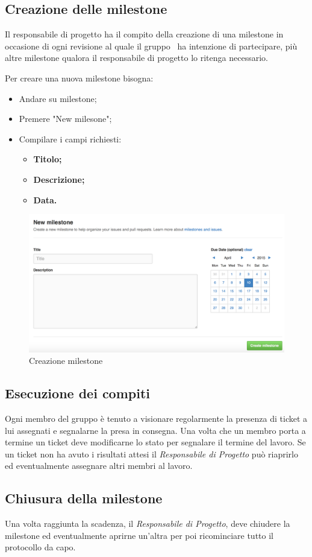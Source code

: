 \subsection{Creazione delle milestone}

Il responsabile di progetto ha il compito della creazione di una milestone in occasione di ogni revisione al quale il gruppo \GRUPPO\ ha intenzione di partecipare, più altre milestone qualora il responsabile di progetto lo ritenga necessario.

Per creare una nuova milestone bisogna:

\begin{itemize}
	\item Andare su milestone;
	\item Premere "New milesone";
	\item Compilare i campi richiesti:
		\begin{itemize}
			\item \textbf{Titolo;}
			\item \textbf{Descrizione;}
			\item \textbf{Data.}
		\end{itemize}
\end{itemize}
\begin{figure}[h]
\centering
\includegraphics[width=0.7\linewidth]{img/milestone}
\caption[Creazione milestone]{Creazione milestone}
\label{fig:milestone}
\end{figure}


\subsection{Esecuzione dei compiti}

Ogni membro del gruppo è tenuto a visionare regolarmente la presenza di ticket a lui assegnati e segnalarne la presa in consegna.
Una volta che un membro porta a termine un ticket deve modificarne lo stato per segnalare il termine del lavoro.
Se un ticket non ha avuto i risultati attesi il \textit{Responsabile di Progetto} può riaprirlo ed eventualmente assegnare altri membri al lavoro.

\subsection{Chiusura della milestone}

Una volta raggiunta la scadenza, il \textit{Responsabile di Progetto}, deve chiudere la milestone ed eventualmente aprirne un'altra per poi ricominciare tutto il protocollo da capo.